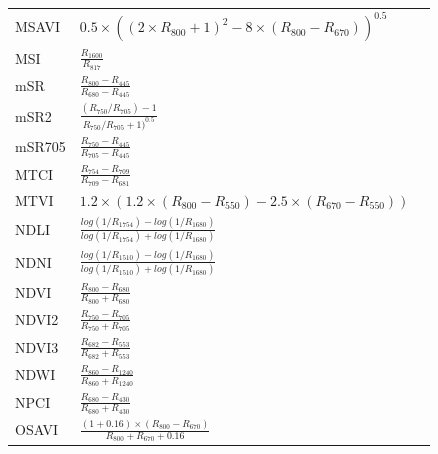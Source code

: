 \documentclass[letterpaper, peerreview, draftcls]{IEEEtran}
\begin{document}
\begin{xtabular*}{0.3\textwidth}{lll}
	MSAVI           & \parbox{5.5cm}{$0.5 \times ((2\times R_{800}+1)^2-8\times (R_{800}-R_{670}))^{0.5}$}                & \cite{qi1994}\\
	MSI             & $\frac{R_{1600}}{R_{817}}$                                                                          & \cite{huntjr1989}\\
	mSR             & $\frac{R_{800}-R_{445}}{R_{680}-R_{445}}$                                                           & \cite{sims2002a} \\
	mSR2            & $\frac{(R_{750}/R_{705})-1}{R_{750}/R_{705}+1)^{0.5}}$                                              & \cite{chen1996}\\
	mSR705          & $\frac{R_{750}-R_{445}}{R_{705}-R_{445}}$                                                           & \cite{sims2002a} \\
	MTCI            & $\frac{R_{754}-R_{709}}{R_{709}-R_{681}}$                                                           & \cite{dash2007}\\
	\midrule
	MTVI            & \parbox{3.8cm}{$1.2 \times (1.2 \times (R_{800}-R_{550})-2.5 \times (R_{670}-R_{550}))$}            & \cite{haboudane2002}\\
	\midrule
	NDLI           & $\frac{log(1/R_{1754}) - log(1/R_{1680})}{log(1/R_{1754}) + log(1/R_{1680})}$                        & \cite{serrano2002} \\
	NDNI           & $\frac{log(1/R_{1510}) - log(1/R_{1680})}{log(1/R_{1510}) + log(1/R_{1680})}$                        & \cite{serrano2002} \\
	NDVI           & $\frac{R_{800}-R_{680}}{R_{800}+R_{680}}$                                                            & \cite{tucker1979} \\
	NDVI2          & $\frac{R_{750}-R_{705}}{R_{750}+R_{705}}$                                                            & \cite{gitelson1994} \\
	NDVI3          & $\frac{R_{682}-R_{553}}{R_{682}+R_{553}}$                                                            & \cite{guanter2005} \\
	NDWI           & $\frac{R_{860}-R_{1240}}{R_{860}+R_{1240}}$                                                          & \cite{gao1996} \\
	NPCI           & $\frac{R_{680}-R_{430}}{R_{680}+R_{430}}$                                                            & \cite{penuelas1994} \\
	OSAVI          & $\frac{(1+0.16) \times (R_{800}-R_{670})}{R_{800}+R_{670}+0.16 }$                                    & \cite{rondeaux1996} \\

\end{xtabular*}
\end{document}
